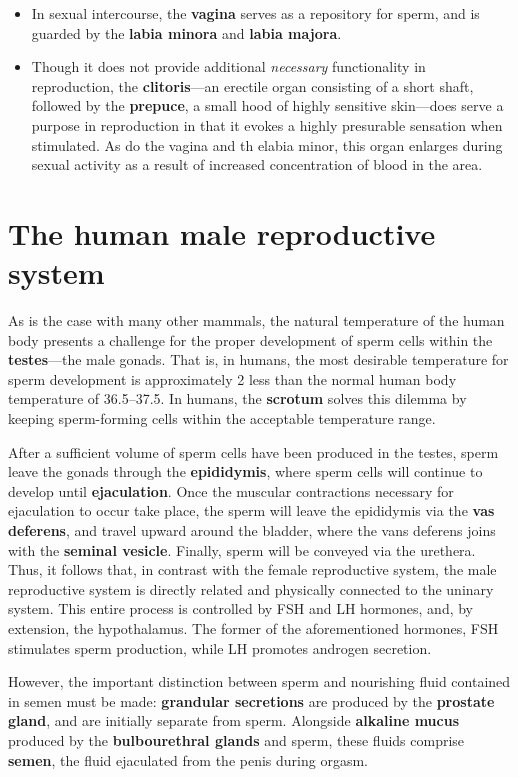 \documentclass{article}
\begin{document}
\begin{itemize}
	\item In sexual intercourse, the \textbf{vagina} serves as a repository for sperm, and
		is guarded by the \textbf{labia minora} and \textbf{labia majora}.
	\item Though it does not provide additional \emph{necessary} functionality in
		reproduction, the \textbf{clitoris}---an erectile organ consisting of a short shaft,
		followed by the \textbf{prepuce}, a small hood of highly sensitive skin---does serve
		a purpose in reproduction in that it evokes a highly presurable sensation when
		stimulated. As do the vagina and th elabia minor, this organ enlarges during sexual
		activity as a result of increased concentration of blood in the area.
\end{itemize}

\section{The human male reproductive system}

As is the case with many other mammals, the natural temperature of the human body presents a
challenge for the proper development of sperm cells within the \textbf{testes}---the male
gonads. That is, in humans, the most desirable temperature for sperm development is
approximately 2 less than the normal human body temperature of
36.5--37.5. In humans, the \textbf{scrotum} solves this dilemma by keeping
sperm-forming cells within the acceptable temperature range.

After a sufficient volume of sperm cells have been produced in the testes, sperm leave
the gonads through the \textbf{epididymis}, where sperm cells will continue to develop
until \textbf{ejaculation}. Once the muscular contractions necessary for ejaculation to
occur take place, the sperm will leave the epididymis via the \textbf{vas deferens}, and
travel upward around the bladder, where the vans deferens joins with the \textbf{seminal
vesicle}. Finally, sperm will be conveyed via the urethera. Thus, it follows that, in
contrast with the female reproductive system, the male reproductive system is directly
related and physically connected to the uninary system. This entire process is
controlled by FSH and LH hormones, and, by extension, the hypothalamus. The former of
the aforementioned hormones, FSH stimulates sperm production, while LH promotes
androgen secretion.

However, the important distinction between sperm and nourishing fluid contained in
semen must be made: \textbf{grandular secretions} are produced by the \textbf{prostate
gland}, and are initially separate from sperm. Alongside \textbf{alkaline mucus}
produced by the \textbf{bulbourethral glands} and sperm, these fluids comprise
\textbf{semen}, the fluid ejaculated from the penis during orgasm.
\end{document}
